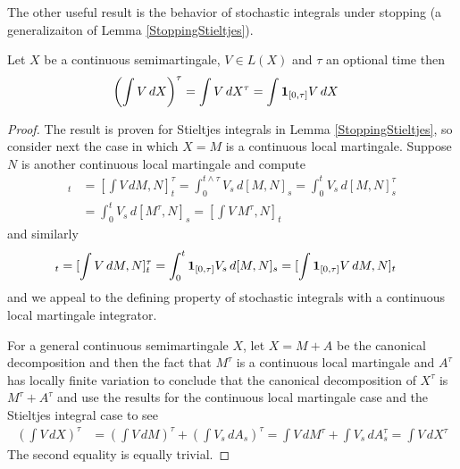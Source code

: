 The other useful result is the behavior of stochastic integrals under stopping (a generalizaiton of Lemma \ref{StoppingStieltjes}).
\begin{lem}\label{StoppingIntegralsContinuousSemimartingale}Let $X$ be a continuous semimartingale, $V \in L(X)$ and $\tau$ an optional time then
\begin{align*}
\left(\int V \, dX \right)^\tau &= \int V \, dX^\tau = \int \textbf{1}_{[0,\tau]} V \, dX
\end{align*}
\end{lem}
\begin{proof}
The result is proven for Stieltjes integrals in Lemma \ref{StoppingStieltjes}, so consider next the case in which $X = M$ is a continuous local martingale.  Suppose $N$ is another continuous local martingale and compute
\begin{align*}
[\left(\int V \, dM \right)^\tau, N]_t &= [\int V \, dM, N]^\tau_t = \int_0^{t \wedge \tau} V_s \, d[M,N]_s = \int_0^t V_s \, d[M,N]^\tau_s \\
&= \int_0^t V_s \, d[M^\tau,N]_s = [\int V \, M^\tau, N]_t
\end{align*}
and similarly
\begin{align*}
[\left(\int V \, dM \right)^\tau, N]_t &= [\int V \, dM, N]^\tau_t = \int_0^t \characteristic{[0,\tau]} V_s \, d[M,N]_s = [\int \characteristic{[0,\tau]} V \, dM, N]_t
\end{align*}
and we appeal to the defining property of stochastic integrals with a continuous local martingale integrator.

For a general continuous semimartingale $X$, let $X = M + A$ be the canonical decomposition and then the fact that $M^\tau$ is a continuous local martingale and $A^\tau$ has locally finite variation to conclude that the canonical decomposition of $X^\tau$ is $M^\tau + A^\tau$ and use the results for the continuous local martingale case and the Stieltjes integral case to see
\begin{align*}
\left(\int V \, dX \right)^\tau &= \left(\int V \, dM\right)^\tau + \left(\int V_s \, dA_s\right)^\tau = \int V \, dM^\tau + \int V_s \, dA^\tau_s = \int V \, dX^\tau
\end{align*}
The second equality is equally trivial.
\end{proof}

